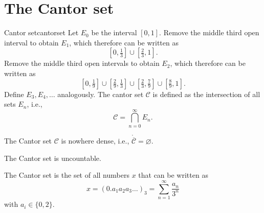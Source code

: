 
\section{The Cantor set}

\begin{defn}{Cantor set}{cantorset}
	Let \(E_0\) be the interval \([0, 1]\). Remove the middle third open interval to obtain \(E_1\), which therefore can be written as \[
		[0, \tfrac{1}{3}] \cup [\tfrac{2}{3}, 1].
	\]
	Remove the middle third open intervals to obtain \(E_2\), which therefore can be written as \[
		[0, \tfrac{1}{9}] \cup
		[\tfrac{2}{9}, \tfrac{1}{3}] \cup
		[\tfrac{2}{3}, \tfrac{7}{9}] \cup
		[\tfrac{8}{9}, 1].
	\]
	Define \(E_3, E_4, \dots\) analogously.
	The cantor set \(\mathcal C\) is defined as the intersection of all sets \(E_n\), i.e., \[
		\mathcal C = \bigcap_{n=0}^\infty E_n.
	\]
\end{defn}

\begin{prop}{}{}
	The Cantor set \(\mathcal C\) is nowhere dense, i.e., \(\mathring{\overline{\mathcal C}} = \varnothing\).
\end{prop}

\begin{thm}{}{}
	The Cantor set is uncountable.
\end{thm}

\begin{prop}{}{}
	The Cantor set is the set of all numbers \(x\) that can be written as \[
		x = (0.a_1a_2a_3\dots)_3 = \sum_{n = 1}^\infty \frac{a_n}{3^n}
	\]
	with \(a_i \in \{0, 2\}\).
\end{prop}

